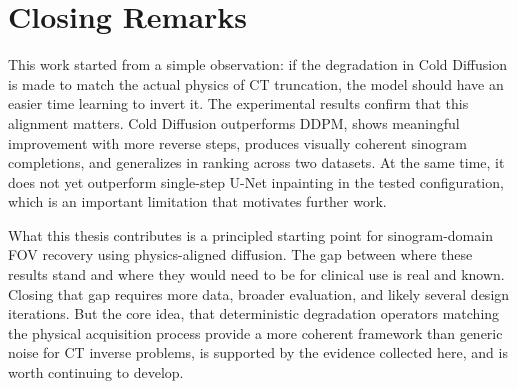 \section{Closing Remarks}

This work started from a simple observation: if the degradation in Cold Diffusion is made to match the actual physics of CT truncation, the model should have an easier time learning to invert it. The experimental results confirm that this alignment matters. Cold Diffusion outperforms DDPM, shows meaningful improvement with more reverse steps, produces visually coherent sinogram completions, and generalizes in ranking across two datasets. At the same time, it does not yet outperform single-step U-Net inpainting in the tested configuration, which is an important limitation that motivates further work.

What this thesis contributes is a principled starting point for sinogram-domain FOV recovery using physics-aligned diffusion. The gap between where these results stand and where they would need to be for clinical use is real and known. Closing that gap requires more data, broader evaluation, and likely several design iterations. But the core idea, that deterministic degradation operators matching the physical acquisition process provide a more coherent framework than generic noise for CT inverse problems, is supported by the evidence collected here, and is worth continuing to develop.
